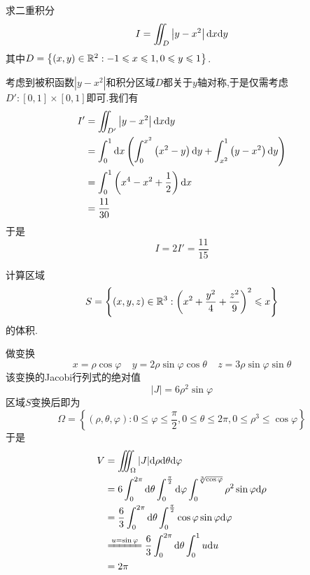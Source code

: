 \documentclass{ctexart}
\begin{document}
\begin{problem}[2.(12\songti{分})]
    求二重积分
    \[I=\iint_{D}\left|y-x^2\right|\mathrm{d} x\mathrm{d} y\]
    其中$D=\left\{(x,y)\in\mathbb{R}^2:-1\leqslant x\leqslant1,0\leqslant y\leqslant1\right\}$.

\end{problem}
\begin{solution}
    考虑到被积函数$\left|y-x^2\right|$和积分区域$D$都关于$y$轴对称,于是仅需考虑$D':[0,1]\times[0,1]$即可.我们有
    \[\begin{aligned}
        I'
        &= \iint_{D'}\left|y-x^2\right|\mathrm{d} x\mathrm{d} y \\
        &= \int_0^1\mathrm{d} x\left(\int_0^{x^2}\left(x^2-y\right)\mathrm{d} y+\int_{x^2}^1\left(y-x^2\right)\mathrm{d} y\right) \\
        &= \int_0^1\left(x^4-x^2+\dfrac12\right)\mathrm{d} x \\
        &= \dfrac{11}{30}
    \end{aligned}\]
    于是
    \[I=2I'=\dfrac{11}{15}\]

\end{solution}
\begin{problem}[3.(12\songti{分})]
    计算区域
    \[S=\left\{(x,y,z)\in\mathbb{R}^3:\left(x^2+\dfrac{y^2}{4}+\dfrac{z^2}{9}\right)^2\leqslant x\right\}\]
    的体积.

\end{problem}
\begin{solution}
    做变换
    \[x=\rho\cos\varphi\ \ \ \ \ y=2\rho\sin\varphi\cos\theta\ \ \ \ \ z=3\rho\sin\varphi\sin\theta\]
    该变换的Jacobi行列式的绝对值
    \[|J|=6\rho^2\sin\varphi\]
    区域$S$变换后即为
    \[\Omega=\left\{(\rho,\theta,\varphi):0\leqslant\varphi\leqslant\dfrac\pi2,0\leqslant\theta\leqslant2\pi,0\leqslant\rho^3\leqslant\cos\varphi\right\}\]
    于是
    \[\begin{aligned}
        V
        &= \iiint_{\Omega}|J|\di\rho\di\theta\di\varphi \\
        &= 6\int_0^{2\pi}\di\theta\int_0^{\frac\pi2}\di\varphi\int_0^{\sqrt[3]{\cos\varphi}}\rho^2\sin\varphi\di\rho \\
        &= \dfrac{6}{3}\int_0^{2\pi}\di\theta\int_0^{\frac\pi2}\cos\varphi\sin\varphi\di\varphi \\
        &\xlongequal{u=\sin\varphi} \dfrac{6}{3}\int_0^{2\pi}\di\theta\int_0^1u\di u \\
        &= 2\pi
    \end{aligned}\]

\end{solution}
\end{document}
